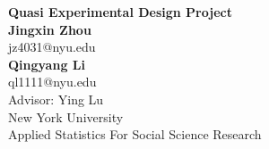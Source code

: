 \documentclass{article}
\begin{document}
	\begin{center}
    
		\LARGE{\textbf{Quasi Experimental Design Project}} \\
        \vspace{1em}
        \normalsize\textbf{Jingxin Zhou} \\
        \normalsize{jz4031@nyu.edu} \\
        \normalsize\textbf{Qingyang Li} \\
        \normalsize{ql1111@nyu.edu}\\
        \vspace{1em}
        \normalsize{Advisor: Ying Lu} \\
        \vspace{1em}
        \normalsize{New York University} \\
        \normalsize{Applied Statistics For Social Science Research}
     
	\end{center}
	
\end{document}
